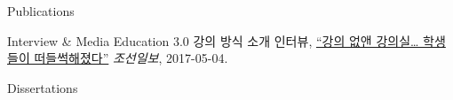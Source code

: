 \begin{rSection}{Publications}
{\begin{pubSubsectionNum}{Interview \& Media}
    Education 3.0 강의 방식 소개 인터뷰,
    \hyperlink{http://news.chosun.com/site/data/html_dir/2017/05/04/2017050400133.html}{``강의 없앤 강의실… 학생들이 떠들썩해졌다''}
    \textit{조선일보}, 2017-05-04.

  \end{pubSubsectionNum}
}

\begin{pubSubsectionNum}{Dissertations}
  \item {}
  \item {}
\end{pubSubsectionNum}


\end{rSection}
